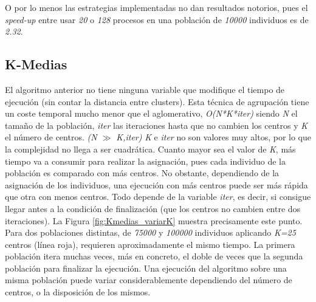 O por lo menos las estrategias implementadas no dan resultados notorios, pues el \textit{speed-up} entre usar \textit{20} o \textit{128} procesos en una población de \textit{10000} individuos es de \textit{2.32}.



\subsection{K-Medias}	

El algoritmo anterior no tiene ninguna variable que modifique el tiempo de ejecución (sin contar la distancia entre clusters). Esta técnica de agrupación tiene un coste temporal mucho menor que el aglomerativo, \textit{O(N*K*iter)} siendo \textit{N} el tamaño de la población, \textit{iter} las iteraciones hasta que no cambien los centros y \textit{K} el número de centros. \textit{(N $\gg$ K,iter)} \textit{K} e \textit{iter} no son valores muy altos, por lo que la complejidad no llega a ser cuadrática. Cuanto mayor sea el valor de \textit{K}, más tiempo va a consumir para realizar la asignación, pues cada individuo de la población es comparado con más centros. No obstante, dependiendo de la asignación de los individuos,  una ejecución con más centros puede ser más rápida que otra con menos centros. Todo depende de la variable \textit{iter}, es decir, si consigue llegar antes a la condición de finalización (que los centros no cambien entre dos iteraciones). La Figura \ref{fig:Kmedias_variarK} muestra precisamente este punto. Para dos poblaciones distintas, de \textit{75000} y \textit{100000} individuos aplicando \textit{K=25} centros (línea roja), requieren aproximadamente el mismo tiempo. La primera población itera muchas veces, más en concreto, el doble de veces que la segunda población para finalizar la ejecución. Una ejecución del algoritmo sobre una misma población puede variar considerablemente dependiendo del número de centros, o la disposición de los mismos.



